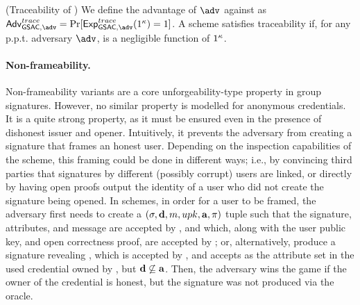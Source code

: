 \begin{definition}{(Traceability of \GSAC)}
  \label{def:trace-gsac}
  We define the advantage \AdvGSACTrace of $\adv$ against \ExpGSACTrace as
  $\AdvGSACTrace=\Pr\lbrack\ExpGSACTrace(1^\secpar)=1\rbrack$.
  A \GSAC scheme satisfies traceability if, for any p.p.t. adversary $\adv$,
  \AdvGSACTrace is a negligible function of $1^\kappa$.
\end{definition}

\paragraph{Non-frameability.} %
Non-frameability variants are a core unforgeability-type property in group
signatures. However, no similar property is modelled for anonymous credentials.
It is a quite strong
property, as it must be ensured even in the presence of dishonest issuer and
opener. Intuitively, it prevents the adversary from creating a signature that
frames an honest user. Depending on the inspection capabilities of the scheme,
this framing could be done in different ways; i.e., by convincing third parties
that signatures by different (possibly corrupt) users are linked, or directly
by having open proofs output the identity of a user who did not create the
signature being opened.
%
In \GSAC schemes, in order for a user to be framed, the adversary first needs to
create a $(\sigma,\mathbf{d},m,upk,\mathbf{a},\pi)$ tuple such that the signature,
attributes, and message are accepted by \Verify, and which, along with the user
public key, and open correctness proof, are accepted by \Judge; or, alternatively,
produce a signature revealing \dattrs, which is accepted by \Verify, and \Judge
accepts \attrs as the attribute set in the used credential owned by \upk, but
$\mathbf{d} \not\subseteq \mathbf{a}$.
Then, the adversary wins the game if the owner of the credential is honest, but
the signature was not produced via the \SIGN oracle.


